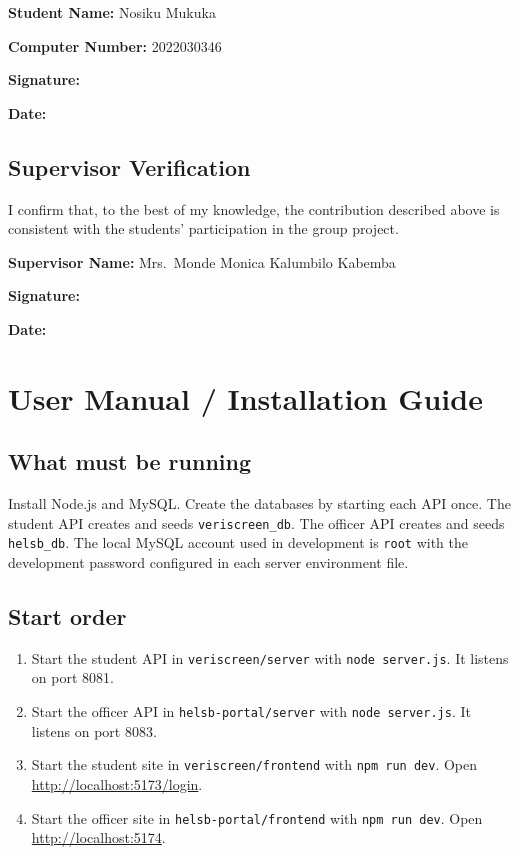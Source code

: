 \documentclass[12pt,a4paper]{report}
\begin{document}
\vspace{1cm}
\noindent\textbf{Student Name:} Nosiku Mukuka

\vspace{0.5cm}
\noindent\textbf{Computer Number:} 2022030346

\vspace{0.5cm}
\noindent\textbf{Signature:} \hrulefill

\vspace{0.5cm}
\noindent\textbf{Date:} \hrulefill

\newpage
\section{Supervisor Verification}
I confirm that, to the best of my knowledge, the contribution described above is consistent with the students' participation in the group project.

\vspace{1cm}
\noindent\textbf{Supervisor Name:} Mrs.\ Monde Monica Kalumbilo Kabemba

\vspace{0.5cm}
\noindent\textbf{Signature:} \hrulefill

\vspace{0.5cm}
\noindent\textbf{Date:} \hrulefill

\chapter{User Manual / Installation Guide}

\section*{What must be running}
Install Node.js and MySQL. Create the databases by starting each API once. The student API creates and seeds \texttt{veriscreen\_db}. The officer API creates and seeds \texttt{helsb\_db}. The local MySQL account used in development is \texttt{root} with the development password configured in each server environment file.

\section*{Start order}
\begin{enumerate}
    \item Start the student API in \texttt{veriscreen/server} with \texttt{node server.js}. It listens on port 8081.
    \item Start the officer API in \texttt{helsb-portal/server} with \texttt{node server.js}. It listens on port 8083.
    \item Start the student site in \texttt{veriscreen/frontend} with \texttt{npm run dev}. Open \url{http://localhost:5173/login}.
    \item Start the officer site in \texttt{helsb-portal/frontend} with \texttt{npm run dev}. Open \url{http://localhost:5174}.
\end{enumerate}
\end{document}
